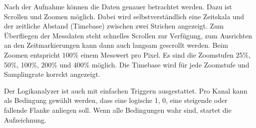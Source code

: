 \documentclass[IN,ngerman,utf8,12pt]{tumbook}
\begin{document}
Nach der Aufnahme können die Daten genauer betrachtet werden.
Dazu ist Scrollen und Zoomen möglich.
Dabei wird selbstverständlich eine Zeitskala und der zeitliche Abstand (Timebase) zwischen zwei Strichen angezeigt.
Zum Überfliegen der Messdaten steht schnelles Scrollen zur Verfügung, zum Ausrichten an den Zeitmarkierungen kann dann auch langsam gescrollt werden.
Beim Zoomen entspricht 100\% einem Messwert pro Pixel.
Es sind die Zoomstufen 25\%, 50\%, 100\%, 200\% und 400\% möglich.
Die Timebase wird für jede Zoomstufe und Samplingrate korrekt angezeigt.

Der Logikanalyzer ist auch mit einfachen Triggern ausgestattet.
Pro Kanal kann als Bedingung gewählt werden, dass eine logische 1, 0, eine steigende oder fallende Flanke anliegen soll.
Wenn alle Bedingungen wahr sind, startet die Aufzeichnung.

%
%
%
%
\end{document}

